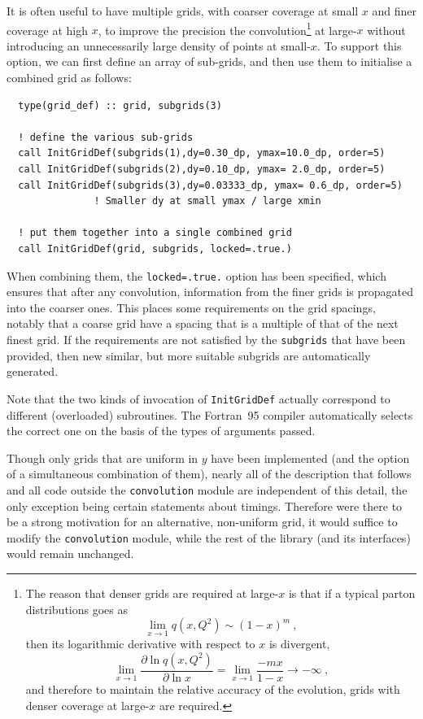 \documentclass[12pt]{article}
\newcommand{\be}{\begin{equation}}
\newcommand{\ee}{\end{equation}}
\newcommand{\ttt}[1]{\texttt{#1}}
\begin{document}
It is often useful to have multiple grids, with
coarser coverage at small $x$ and finer coverage at high $x$, to
improve the precision the convolution\footnote{
The reason that denser grids are required at large-$x$ is that
if a typical parton distributions goes as
\be
\lim_{x\to 1} q(x,Q^2) \sim (1-x)^m \ ,
\ee
then its logarithmic derivative with respect to $x$ is divergent,
\be
\lim_{x \to 1} \frac{\partial  \ln q(x,Q^2) }{\partial \ln x} = 
\lim_{x \to 1} \frac{-mx}{1-x} \to -\infty \ ,
\ee
and therefore to maintain the relative accuracy of the evolution, grids
with denser coverage at large-$x$ are required.} at large-$x$ without
introducing an unnecessarily large density of points
at small-$x$.
To support
this option, we can first define an array of sub-grids, and then use them to
initialise a combined grid as follows:
\begin{lstlisting}
  type(grid_def) :: grid, subgrids(3)

  ! define the various sub-grids
  call InitGridDef(subgrids(1),dy=0.30_dp, ymax=10.0_dp, order=5)
  call InitGridDef(subgrids(2),dy=0.10_dp, ymax= 2.0_dp, order=5)
  call InitGridDef(subgrids(3),dy=0.03333_dp, ymax= 0.6_dp, order=5) 
               ! Smaller dy at small ymax / large xmin 

  ! put them together into a single combined grid
  call InitGridDef(grid, subgrids, locked=.true.)
\end{lstlisting}
When combining them, the \ttt{locked=.true.} option has been specified,
which ensures that after any convolution, information from the finer
grids is propagated into the coarser ones. This places some
requirements on the grid spacings, notably that a coarse grid have a
spacing that is a multiple of that of the next finest grid. If the
requirements are not satisfied by the \ttt{subgrids} that have been
provided, then new similar, but more suitable subgrids are
automatically generated. 

Note that the two kinds of invocation of \ttt{InitGridDef} actually
correspond to different (overloaded) subroutines. The Fortran~95 compiler
automatically selects the correct one on the basis of the types of
arguments passed.

Though only grids that are uniform in $y$ have been implemented
(and the option of a simultaneous combination of them),
nearly all of the description that follows and all code outside the
\texttt{convolution} module are independent of this detail, the only
exception being certain statements about timings. Therefore were
there to be a strong motivation for an alternative, non-uniform grid,
it would suffice to modify the \texttt{convolution} module, while the
rest of the library (and its interfaces) would remain unchanged.
\end{document}
